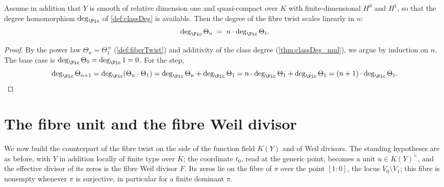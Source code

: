 \begin{theorem}
  \label{thm:classDeg_fiberTwist}
  \leanok
  Assume in addition that \(Y\) is smooth of relative dimension one and quasi-compact over \(K\)
  with finite-dimensional \(H^0\) and \(H^1\), so that the degree homomorphism \(\deg_{\Pic}\) of
  \ref{def:classDeg} is available. Then the degree of the fibre twist scales linearly in \(n\):
  \[
    \deg_{\Pic} \Theta_n \;=\; n \cdot \deg_{\Pic} \Theta_1 .
  \]
\end{theorem}
\begin{proof}
  \leanok
  By the power law \(\Theta_n = \Theta_1^{\,n}\) (\ref{def:fiberTwist}) and additivity of the class
  degree (\ref{thm:classDeg_mul}), we argue by induction on \(n\). The base case is
  \(\deg_{\Pic}\Theta_0 = \deg_{\Pic} 1 = 0\). For the step,
  \[
    \deg_{\Pic}\Theta_{n+1} = \deg_{\Pic}(\Theta_n \cdot \Theta_1)
      = \deg_{\Pic}\Theta_n + \deg_{\Pic}\Theta_1
      = n\cdot\deg_{\Pic}\Theta_1 + \deg_{\Pic}\Theta_1
      = (n+1)\cdot\deg_{\Pic}\Theta_1 . \qedhere
  \]
\end{proof}

\section{The fibre unit and the fibre Weil divisor}

We now build the counterpart of the fibre twist on the side of the function field \(K(Y)\) and of
Weil divisors. The standing hypotheses are as before, with \(Y\) in addition locally of finite
type over \(K\); the coordinate \(t_0\), read at the generic point, becomes a unit \(u \in
K(Y)^{\times}\), and the effective divisor of its zeros is the fibre Weil divisor \(F\). Its zeros
lie on the fibre of \(\pi\) over the point \([1 : 0]\), the locus \(V_0 \setminus V_1\); this fibre
is nonempty whenever \(\pi\) is surjective, in particular for a finite dominant \(\pi\).

